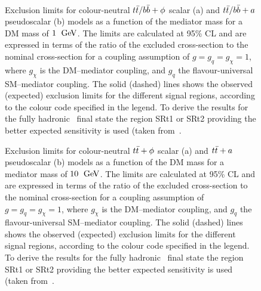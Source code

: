 		\begin{figure}[!htb]
			\centering
			\\
			\caption{Exclusion limits for colour-neutral $t\bar{t}/b\bar{b}+\phi$ scalar (a) and $t\bar{t}/b\bar{b}+a$ pseudoscalar (b) models as a function of the mediator mass for a DM mass of $1\;\GeV$. The limits are calculated at 95\% CL and are expressed in terms of the ratio of the excluded cross-section to the nominal cross-section for a coupling assumption of $g = g_q = g_\chi = 1$, where $g_\chi$ is the DM–mediator coupling, and $g_q$ the flavour-universal SM–mediator coupling. The solid (dashed) lines shows the observed (expected) exclusion limits for the different signal regions, according to the colour code specified in the legend. To derive the results for the fully hadronic \ttbar\ final state the region SRt1 or SRt2 providing the better expected sensitivity is used (taken from~\cite{DMhf}.}
			\label{fig:dmresults}
		\end{figure}

		\begin{figure}
			\centering
			\caption{Exclusion limits for colour-neutral $t\bar{t}+\phi$ scalar (a) and $t\bar{t}+a$ pseudoscalar (b)  models as a function of the DM mass for a mediator mass of $10\;\GeV$. The limits are calculated at 95\% CL and are expressed in terms of the ratio of the excluded cross-section to the nominal cross-section for a coupling assumption of $g = g_q = g_\chi = 1$, where $g_\chi$ is the DM–mediator coupling, and $g_q$ the flavour-universal SM–mediator coupling. The solid (dashed) lines shows the observed (expected) exclusion limits for the different signal regions, according to the colour code specified in the legend. To derive the results for the fully hadronic \ttbar\ final state the region SRt1 or SRt2 providing the better expected sensitivity is used (taken from~\cite{DMhf}.}
			\label{fig:dmresultschi}
		\end{figure}